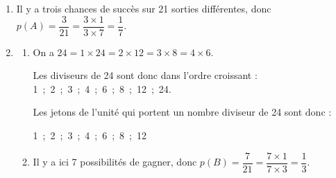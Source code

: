 \medskip

%

\begin{enumerate}
\item %
Il y a trois chances de succès sur 21 sorties différentes, donc $p(A) = \dfrac{3}{21} = \dfrac{3 \times 1}{3 \times 7} = \dfrac17$.


\item 
	\begin{enumerate}
		\item %

On a $24 = 1\times 24 = 2 \times 12 = 3 \times 8 = 4 \times 6$.

Les diviseurs de 24 sont donc dans l'ordre croissant : 1~;~2~;~3~;~4~;~6~;~8~;~12~;~24.

Les jetons de l'unité qui portent un nombre diviseur de 24 sont donc :

1~;~2~;~3~;~4~;~6~;~8~;~12
		\item %
		Il y a ici 7 possibilités de gagner, donc $p(B) = \dfrac{7}{21} = \dfrac{7 \times 1}{7 \times 3} = \dfrac13$.
	\end{enumerate}
\end{enumerate}

\medskip
